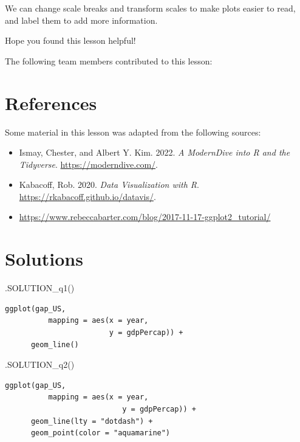 \documentclass[
  letterpaper,
  DIV=11,
  numbers=noendperiod]{scrreprt}
\newenvironment{Shaded}{\begin{snugshade}}{\end{snugshade}}
\newcommand{\FunctionTok}[1]{\textcolor[rgb]{0.28,0.35,0.67}{#1}}
\newcommand{\NormalTok}[1]{\textcolor[rgb]{0.00,0.23,0.31}{#1}}
\providecommand{\tightlist}{%
  \setlength{\itemsep}{0pt}\setlength{\parskip}{0pt}}\usepackage{longtable,booktabs,array}
\begin{document}
We can change scale breaks and transform scales to make plots easier to
read, and label them to add more information.

Hope you found this lesson helpful!

The following team members contributed to this lesson:

\hypertarget{references-2}{%
\section*{References}\label{references-2}}


Some material in this lesson was adapted from the following sources:

\begin{itemize}
\tightlist
\item
  Ismay, Chester, and Albert Y. Kim. 2022. \emph{A ModernDive into R and
  the Tidyverse}. \url{https://moderndive.com/}.
\item
  Kabacoff, Rob. 2020. \emph{Data Visualization with R}.
  \url{https://rkabacoff.github.io/datavis/}.
\item
  \url{https://www.rebeccabarter.com/blog/2017-11-17-ggplot2_tutorial/}
\end{itemize}

\hypertarget{solutions-2}{%
\section{Solutions}\label{solutions-2}}

\begin{Shaded}
\begin{Highlighting}[]
\FunctionTok{.SOLUTION\_q1}\NormalTok{()}
\end{Highlighting}
\end{Shaded}

\begin{verbatim}
ggplot(gap_US, 
          mapping = aes(x = year, 
                        y = gdpPercap)) +
      geom_line()
\end{verbatim}

\begin{Shaded}
\begin{Highlighting}[]
\FunctionTok{.SOLUTION\_q2}\NormalTok{()}
\end{Highlighting}
\end{Shaded}

\begin{verbatim}
ggplot(gap_US, 
          mapping = aes(x = year, 
                           y = gdpPercap)) +
      geom_line(lty = "dotdash") +
      geom_point(color = "aquamarine")
\end{verbatim}
\end{document}
